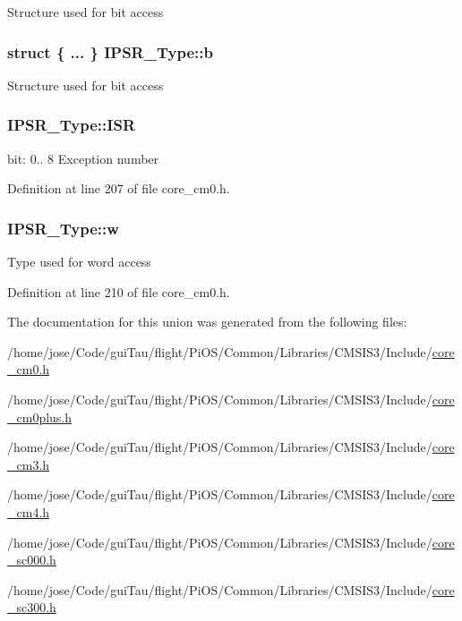 Structure used for bit access \hypertarget{union_i_p_s_r___type_a2006d2ca6e88ca91ae1156fd750587de}{
\subsubsection[{b}]{\setlength{\rightskip}{0pt plus 5cm}struct \{ ... \}   I\-P\-S\-R\-\_\-\-Type\-::b}}\label{union_i_p_s_r___type_a2006d2ca6e88ca91ae1156fd750587de}
Structure used for bit access \hypertarget{union_i_p_s_r___type_ab46e5f1b2f4d17cfb9aca4fffcbb2fa5}{
\subsubsection[{I\-S\-R}]{ I\-P\-S\-R\-\_\-\-Type\-::\-I\-S\-R}}\label{union_i_p_s_r___type_ab46e5f1b2f4d17cfb9aca4fffcbb2fa5}
bit\-: 0.. 8 Exception number 

Definition at line 207 of file core\-\_\-cm0.\-h.

\hypertarget{union_i_p_s_r___type_a4adca999d3a0bc1ae682d73ea7cfa879}{
\subsubsection[{w}]{ I\-P\-S\-R\-\_\-\-Type\-::w}}\label{union_i_p_s_r___type_a4adca999d3a0bc1ae682d73ea7cfa879}
Type used for word access 

Definition at line 210 of file core\-\_\-cm0.\-h.



The documentation for this union was generated from the following files\-:\begin{DoxyCompactItemize}
\item 
/home/jose/\-Code/gui\-Tau/flight/\-Pi\-O\-S/\-Common/\-Libraries/\-C\-M\-S\-I\-S3/\-Include/\hyperlink{core__cm0_8h}{core\-\_\-cm0.\-h}\item 
/home/jose/\-Code/gui\-Tau/flight/\-Pi\-O\-S/\-Common/\-Libraries/\-C\-M\-S\-I\-S3/\-Include/\hyperlink{core__cm0plus_8h}{core\-\_\-cm0plus.\-h}\item 
/home/jose/\-Code/gui\-Tau/flight/\-Pi\-O\-S/\-Common/\-Libraries/\-C\-M\-S\-I\-S3/\-Include/\hyperlink{_common_2_libraries_2_c_m_s_i_s3_2_include_2core__cm3_8h}{core\-\_\-cm3.\-h}\item 
/home/jose/\-Code/gui\-Tau/flight/\-Pi\-O\-S/\-Common/\-Libraries/\-C\-M\-S\-I\-S3/\-Include/\hyperlink{core__cm4_8h}{core\-\_\-cm4.\-h}\item 
/home/jose/\-Code/gui\-Tau/flight/\-Pi\-O\-S/\-Common/\-Libraries/\-C\-M\-S\-I\-S3/\-Include/\hyperlink{core__sc000_8h}{core\-\_\-sc000.\-h}\item 
/home/jose/\-Code/gui\-Tau/flight/\-Pi\-O\-S/\-Common/\-Libraries/\-C\-M\-S\-I\-S3/\-Include/\hyperlink{core__sc300_8h}{core\-\_\-sc300.\-h}\end{DoxyCompactItemize}
